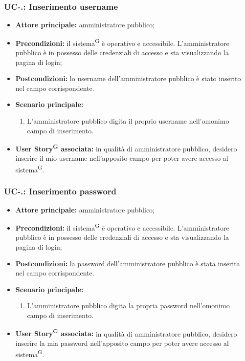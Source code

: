 \documentclass[8pt]{article}
\newcommand{\glossterm}[1]{#1\textsuperscript{G}} %
\begin{document}
\subsubsection*{UC-\theuc .\speconenumber: Inserimento username} 
\begin{itemize}
    \item \textbf{Attore principale:} amministratore pubblico;
    \item \textbf{Precondizioni:} il \glossterm{sistema} è operativo e accessibile. L'amministratore pubblico è in possesso delle credenziali di accesso e sta visualizzando la pagina di login;
    \item \textbf{Postcondizioni:} lo username dell'amministratore pubblico è stato inserito nel campo corrispondente.
    \item \textbf{Scenario principale:} 
        \begin{enumerate}
        \item L'amministratore pubblico digita il proprio username nell'omonimo campo di inserimento.
        \end{enumerate}
    \item \textbf{\glossterm{User Story} associata:} in qualità di amministratore pubblico, desidero inserire il mio username nell'apposito campo per poter avere accesso al \glossterm{sistema}.
\end{itemize}

\subsubsection*{UC-\theuc .\speconenumber: Inserimento password} 
\begin{itemize}
    \item \textbf{Attore principale:} amministratore pubblico;
    \item \textbf{Precondizioni:} il \glossterm{sistema} è operativo e accessibile. L'amministratore pubblico è in possesso delle credenziali di accesso e sta visualizzando la pagina di login;
    \item \textbf{Postcondizioni:} la password dell'amministratore pubblico è stata inserita nel campo corrispondente.
    \item \textbf{Scenario principale:} 
        \begin{enumerate}
        \item L'amministratore pubblico digita la propria password nell'omonimo campo di inserimento.
        \end{enumerate}
    \item \textbf{\glossterm{User Story} associata:} in qualità di amministratore pubblico, desidero inserire la mia password nell'apposito campo per poter avere accesso al \glossterm{sistema}.
\end{itemize}
\end{document}

